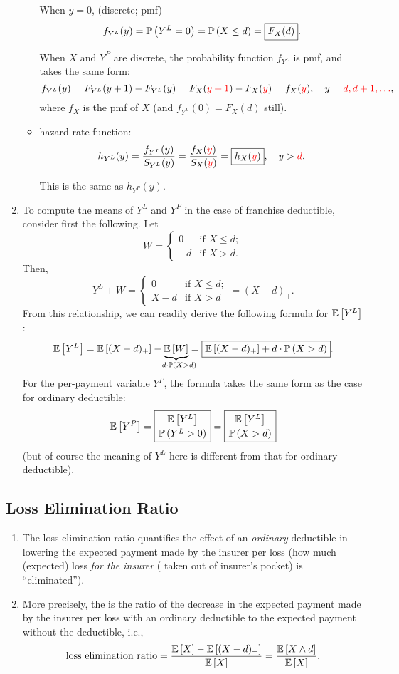 \begin{enumerate}
\begin{itemize}
When \(y=0\), (discrete; pmf)
\[
f_{Y^L}(y)=\mathbb{P}\left(Y^L=0\right)=\mathbb{P}\left(X\le d\right)=\boxed{F_X(d)}.
\]
\begin{note}
When \(X\) and \(Y^P\) are discrete, the probability function \(f_{Y^L}\) is
pmf, and takes the same form:
\[
f_{Y^L}(y)=F_{Y^L}(y+1)-F_{Y^L}(y)
=F_X({\color{red}y+1})-F_X({\color{red}y})
=f_X({\color{red}y}),\quad y={\color{red}d,d+1,\dotsc},
\]
where \(f_X\) is the pmf of \(X\) (and \(f_{Y^L}(0)=F_X(d)\) still).
\end{note}
\item hazard rate function:
\[
h_{Y^L}(y)=\frac{f_{Y^L}(y)}{S_{Y^L}(y)}=\frac{f_X({\color{red}y})}{S_X({\color{red}y})}
=\boxed{h_X({\color{red}y})},\quad y>{\color{red}d}.
\]
\begin{note}
This is the same as \(h_{Y^P}(y)\).
\end{note}
\end{itemize}
\item \label{it:fran-yl-yp-mean}
To compute the means of \(Y^L\) and \(Y^P\) in the case of franchise
deductible, consider first the following. Let
\[
W=\begin{cases}
0&\text{if \(X\le d\)};\\
-d&\text{if \(X>d\)}.
\end{cases}
\]
Then,
\[
Y^L+W=
\begin{cases}
0&\text{if \(X\le d\)};\\
X-d&\text{if \(X>d\)}
\end{cases}
=(X-d)_{+}.
\]
From this relationship, we can readily derive the following formula for
\(\mathbb{E}\left[Y^L\right]\):
\[
\expv{Y^L}=\expv{(X-d)_+}-\underbrace{\expv{W}}_{\mathclap{-d\cdot\prob{X>d}}}
=\boxed{\expv{(X-d)_+}+d\cdot\prob{X>d}}.
\]
For the per-payment variable \(Y^P\), the formula takes the same form as the
case for ordinary deductible:
\[
\mathbb{E}\left[Y^P\right]=\boxed{\frac{\mathbb{E}\left[Y^L\right]}{\mathbb{P}\left(Y^L>0\right)}}
=\boxed{\frac{\mathbb{E}\left[Y^L\right]}{\mathbb{P}\left(X>d\right)}}
\]
(but of course the meaning of \(Y^L\) here is different from that for ordinary
deductible).
\end{enumerate}
\subsection{Loss Elimination Ratio}
\begin{enumerate}
\item The loss elimination ratio quantifies the effect of an \emph{ordinary}
deductible in lowering the expected payment  made by the
insurer  per loss (how much (expected) loss \emph{for the
insurer} ( taken out of insurer's pocket) is
``eliminated'').

\item More precisely, the  is the ratio of the
decrease  in the expected payment  made
by the insurer  per loss with an ordinary deductible to the
expected payment without the deductible, i.e.,
\[
\text{loss elimination ratio}=\frac{\mathbb{E}\left[X\right]-\mathbb{E}\left[(X-d)_{+}\right]}{\mathbb{E}\left[X\right]}
=\frac{\mathbb{E}\left[X\wedge d\right]}{\mathbb{E}\left[X\right]}.
\]
\end{enumerate}
